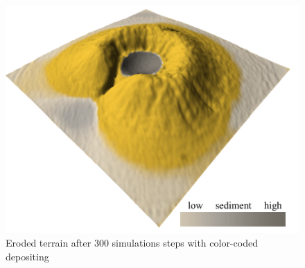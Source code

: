 \begin{figure}
	\centering
	\includegraphics[width=\linewidth]{NWD05/hydraulic_errosion_d}
	\caption{Eroded terrain after 300 simulations steps with color-coded depositing}
	\label{fig:eroded_terrain}
\end{figure}